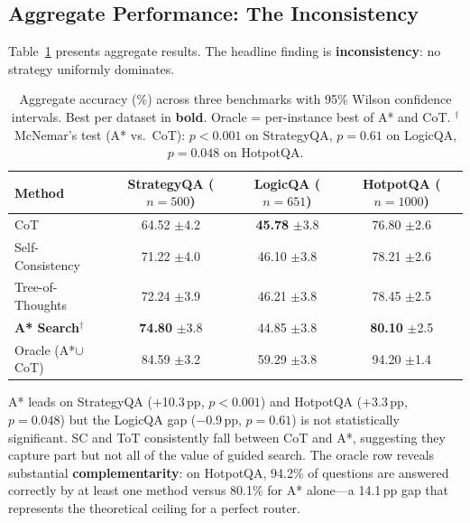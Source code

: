 \documentclass{article}
\newcommand{\pp}{\,pp\xspace}
\begin{document}
\subsection{Aggregate Performance: The Inconsistency}
\label{sec:aggregate}

Table~\ref{tab:aggregate} presents aggregate results.  The headline finding is
\textbf{inconsistency}: no strategy uniformly dominates.

\begin{table}[t]
\centering
\caption{Aggregate accuracy (\%) across three benchmarks with 95\% Wilson
confidence intervals.  Best per dataset in \textbf{bold}.  Oracle =
per-instance best of A* and CoT.  $^\dagger$McNemar's test (A* vs.\ CoT):
$p < 0.001$ on StrategyQA, $p = 0.61$ on LogicQA, $p = 0.048$ on HotpotQA.}
\label{tab:aggregate}
\small
\begin{tabular}{@{}lccc@{}}
\toprule
\textbf{Method} & \textbf{StrategyQA} ($n{=}500$) & \textbf{LogicQA}
($n{=}651$) & \textbf{HotpotQA} ($n{=}1000$) \\
\midrule
CoT
  & 64.52 {\scriptsize$\pm$4.2}
  & \textbf{45.78} {\scriptsize$\pm$3.8}
  & 76.80 {\scriptsize$\pm$2.6} \\
Self-Consistency
  & 71.22 {\scriptsize$\pm$4.0}
  & 46.10 {\scriptsize$\pm$3.8}
  & 78.21 {\scriptsize$\pm$2.6} \\
Tree-of-Thoughts
  & 72.24 {\scriptsize$\pm$3.9}
  & 46.21 {\scriptsize$\pm$3.8}
  & 78.45 {\scriptsize$\pm$2.5} \\
\textbf{A* Search}$^\dagger$
  & \textbf{74.80} {\scriptsize$\pm$3.8}
  & 44.85 {\scriptsize$\pm$3.8}
  & \textbf{80.10} {\scriptsize$\pm$2.5} \\
\midrule
Oracle (A*$\cup$CoT)
  & 84.59 {\scriptsize$\pm$3.2}
  & 59.29 {\scriptsize$\pm$3.8}
  & 94.20 {\scriptsize$\pm$1.4} \\
\bottomrule
\end{tabular}
\end{table}

A* leads on StrategyQA (+10.3\pp, $p < 0.001$) and HotpotQA (+3.3\pp,
$p = 0.048$) but the LogicQA gap ($-$0.9\pp, $p = 0.61$) is not
statistically significant.  SC and ToT consistently fall between CoT and A*,
suggesting they capture part but not all of the value of guided search.  The
oracle row reveals substantial \textbf{complementarity}: on HotpotQA, 94.2\%
of questions are answered correctly by at least one method versus 80.1\% for
A* alone---a 14.1\pp gap that represents the theoretical ceiling for a perfect
router.
\end{document}
